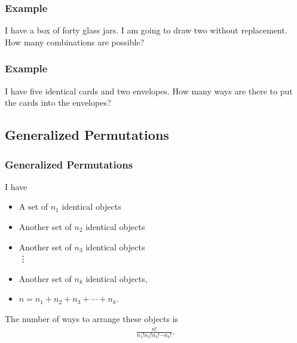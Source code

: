 \begin{frame}
  \frametitle{Example}

  I have a box of forty glass jars. I am going to draw two without
  replacement. How many combinations are possible?

\end{frame}


\begin{frame}
  \frametitle{Example}

  I have five identical cards and two envelopes. How many ways are
  there to put the cards into the envelopes?

\end{frame}






\subsection{Generalized Permutations}

\begin{frame}
  \frametitle{Generalized Permutations}

  I have
  \begin{itemize}
  \item A set of $n_1$ identical objects
  \item Another set of $n_2$ identical objects 
  \item Another set of $n_3$ identical objects \\
    \vdots
  \item Another set of $n_k$ identical objects, \\
  \item $n=n_1+n_2+n_3+\cdots+n_k$.
  \end{itemize}

  The number of ways to arrange these objects is 
  \begin{eqnarray*}
    \frac{n!}{n_1! n_2! n_3! \cdots n_k!}.
  \end{eqnarray*}
  
\end{frame}



